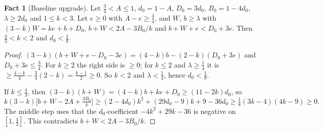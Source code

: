 \documentclass[11pt,a4paper]{article}
\numberwithin{equation}{section}
\theoremstyle{definition}
\newtheorem{fact}{Fact}
\begin{document}
\begin{fact}[Baseline upgrade]\label{fact:upgrade}Let $\frac34<A\le1$, $d_0=1-A$, $D_0=3d_0$, $B_0=1-4d_0$, $\lambda\ge2d_0$ and
$1\le k<3$. Let $e\ge0$ with $A-e\ge\frac34$, and $W$, $b\ge\lambda$ with
$(3-k)W=ke+b+D_0$, $b+W<2A-3B_0/k$ and $b+W+e<D_0+3e$. Then $\frac43<k<2$ and
$d_0<\frac18$.
\end{fact}
\begin{proof}
$(3-k)(b+W+e-D_0-3e)=(4-k)b-(2-k)(D_0+3e)$ and $D_0+3e\le\frac34$. For $k\ge2$
the right side is $\ge0$; for $k\le2$ and $\lambda\ge\frac14$ it is
$\ge\frac{4-k}4-\frac34(2-k)=\frac{k-1}2\ge0$. So $k<2$ and $\lambda<\frac14$,
hence $d_0<\frac18$.

If $k\le\frac43$, then $(3-k)(b+W)=(4-k)b+ke+D_0\ge(11-2k)d_0$, so
\[
k(3-k)\bigl[b+W-2A+\tfrac{3B_0}k\bigr]\ge(2-4d_0)k^2+(29d_0-9)k+9-36d_0
\ge\tfrac18(3k-4)(4k-9)\ge0.
\]
The middle step uses that the $d_0$-coefficient $-4k^2+29k-36$ is negative on
$[1,\frac43]$. This contradicts $b+W<2A-3B_0/k$.
\end{proof}
\end{document}
